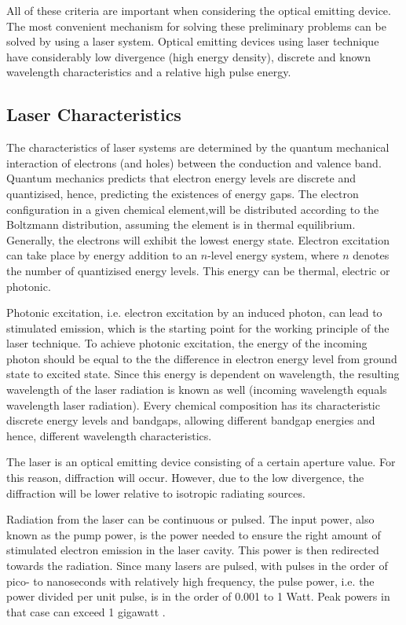 All of these criteria are important when considering the optical emitting device. The most convenient mechanism for solving these preliminary problems can be solved by using a \ac{laser} system. Optical emitting devices using \acs{laser} technique have considerably low divergence (high energy density),  discrete and known wavelength characteristics and a relative high pulse energy.

\subsection{Laser Characteristics}
	\label{blDOLSRchar}
The characteristics of \acs{laser} systems are determined by the quantum mechanical interaction of electrons (and holes) between the conduction and valence band. Quantum mechanics predicts that electron energy levels are discrete and quantizised, hence, predicting the existences of energy gaps. The electron configuration in a given chemical element,will be distributed according to the Boltzmann distribution, assuming the element is in thermal equilibrium. Generally, the electrons will exhibit the lowest energy state. Electron excitation can take place by energy addition to an $n$-level energy system, where $n$ denotes the number of quantizised energy levels. This energy can be thermal, electric or photonic. 

Photonic excitation, i.e. electron excitation by an induced photon, can lead to stimulated emission, which is the starting point for the working principle of the \acs{laser} technique. To achieve photonic excitation, the energy of the incoming photon should be equal to the the difference in electron energy level from ground state to excited state. Since this energy is dependent on wavelength, the resulting wavelength of the \acs{laser} radiation is known as well (incoming wavelength equals wavelength laser radiation). Every chemical composition has its characteristic discrete energy levels and bandgaps, allowing different bandgap energies and hence, different wavelength characteristics. 

The \acs{laser} is an optical emitting device consisting of a certain aperture value. For this reason, diffraction will occur. However, due to the low divergence, the diffraction will be lower relative to isotropic radiating sources.

Radiation from the \acs{laser} can be continuous or pulsed. The input power, also known as the pump power, is the power needed to ensure the right amount of stimulated electron emission in the \acs{laser} cavity. This power is then redirected towards the radiation. Since many \acs{laser}s are pulsed, with pulses in the order of pico- to nanoseconds with relatively high frequency, the pulse power, i.e. the power divided per unit pulse, is in the order of 0.001 to 1 Watt. Peak powers in that case can exceed 1 gigawatt \cite{quantumoptics}.  

